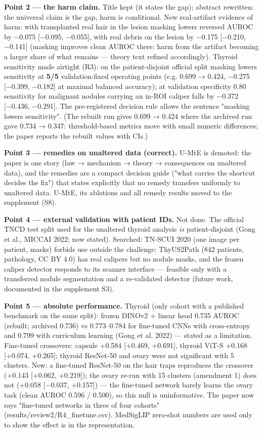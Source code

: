 {\textbf{Point 2 --- the harm claim.} Title kept (it states the gap); abstract rewritten: the universal claim is the gap,
harm is conditional. New real-artifact evidence of harm: with transplanted real hair in the lesion masking lowers
reversed AUROC by −0.075 {[}−0.095, −0.055{]}, with real debris on the lesion by −0.175 {[}−0.210, −0.141{]} (masking improves
clean AUROC there: harm from the artifact becoming a larger share of what remains --- theory text refined accordingly).
Thyroid sensitivity made airtight (R3): on the patient-disjoint official split masking lowers sensitivity at \textbf{5/5}
validation-fixed operating points (e.g. 0.699 → 0.424, −0.275 {[}−0.399, −0.182{]} at maximal balanced accuracy); at
validation specificity 0.80 sensitivity for malignant nodules carrying an in-ROI caliper falls by −0.372
{[}−0.436, −0.291{]}. The pre-registered decision rule allows the sentence "masking lowers sensitivity". (The rebuilt run
gives 0.699 → 0.424 where the archived run gave 0.734 → 0.347: threshold-based metrics move with small numeric
differences; the paper reports the rebuilt values with CIs.)

\textbf{Point 3 --- remedies on unaltered data (correct).} U-MtE is demoted: the paper is one story (law → mechanism →
theory → consequences on unaltered data), and the remedies are a compact decision guide ("what carries the shortcut
decides the fix") that states explicitly that no remedy transfers uniformly to unaltered data. U-MtE, its ablations
and all remedy results moved to the supplement (S8).

\textbf{Point 4 --- external validation with patient IDs.} Not done. The official TNCD test split used for the unaltered
thyroid analysis \emph{is} patient-disjoint (Gong et al., MICCAI 2022; now stated). Searched: TN-SCUI 2020 (one image per
patient, masks) forbids use outside the challenge; ThyUS2Path (842 patients, pathology, CC BY 4.0) has real calipers
but no nodule masks, and the frozen caliper detector responds to its scanner interface --- feasible only with a
transferred nodule segmentation and a re-validated detector (future work, documented in the supplement S3).

\textbf{Point 5 --- absolute performance.} Thyroid (only cohort with a published benchmark on the same split): frozen
DINOv2 + linear head 0.735 AUROC (rebuilt; archived 0.736) vs 0.773--0.784 for fine-tuned CNNs with cross-entropy and
0.799 with curriculum learning (Gong et al. 2022) --- stated as a limitation. Fine-tuned crossovers: capsule +0.584
{[}+0.469, +0.691{]}, thyroid ViT-S +0.168 {[}+0.074, +0.265{]}; thyroid ResNet-50 and ovary were not significant with 5
clusters. New: a fine-tuned ResNet-50 on the hair traps reproduces the crossover (+0.143 {[}+0.062, +0.219{]}); the ovary
re-run with 15 clusters (amendment 1) does not (+0.058 {[}−0.037, +0.157{]}) --- the fine-tuned network barely learns the ovary
task (clean AUROC 0.596 / 0.500), so this null is uninformative. The paper now says "fine-tuned networks in three of
four cohorts" (results/review2/R4\_finetune.csv). MedSigLIP zero-shot numbers are used only to show the effect is in the representation.

}
